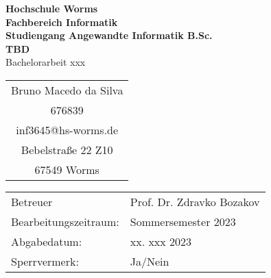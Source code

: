 \begin{titlepage}
    \vspace*{2mm}
    \begin{center}
        \Large
        \textbf{Hochschule Worms}\\
        \textbf{Fachbereich Informatik}\\
        \textbf{Studiengang Angewandte Informatik B.Sc.}\\
        \vspace{3cm}
        \textbf{TBD}\\
        \vspace{1cm}
        \large
        Bachelorarbeit xxx\\
        \vspace{3cm}
        \begin {table}[ht]
        \centering
            \begin{tabular}{c}
                Bruno Macedo da Silva  \\ 
                676839                \\
                inf3645@hs-worms.de   \\
                Bebelstraße 22 Z10    \\
                67549 Worms            \\
            \end{tabular}
        \end {table}
        \vspace{2cm}
        \large
        \vspace{1cm}
        \begin{table}[h]
            \centering
            \begin{tabular}{l l}
                Betreuer                  & Prof. Dr. Zdravko Bozakov \\
                Bearbeitungszeitraum:     & Sommersemester 2023 \\
                Abgabedatum:              & xx. xxx 2023 \\
                Sperrvermerk:             & Ja/Nein \\
            \end{tabular}
        \end{table}    
    \end{center}
    \normalsize
    \vfill
\end{titlepage}